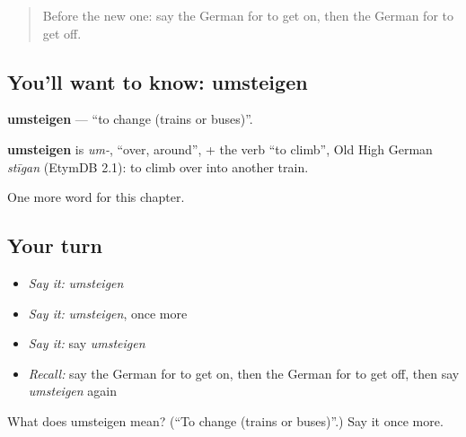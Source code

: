 \label{lesson:GE-C178-umsteigen}



\begin{quote}
Before the new one: say the German for to get on, then the German for to get off.
\end{quote}

\subsection*{You'll want to know: umsteigen}
\textbf{umsteigen} — \textquotedblleft{}to change (trains or buses)\textquotedblright{}.

\begin{cousinweb}
\textbf{umsteigen} is \emph{um-}, \textquotedblleft{}over, around\textquotedblright{}, + the verb \textquotedblleft{}to climb\textquotedblright{}, Old High German \emph{stīgan} (EtymDB 2.1): to climb over into another train.
\end{cousinweb}

\begin{grammarlens}[title={What you've built}]
One more word for this chapter.
\end{grammarlens}

\subsection*{Your turn}
\begin{itemize}
\raggedright
  \item \emph{Say it:} \emph{umsteigen}
  \item \emph{Say it:} \emph{umsteigen}, once more
  \item \emph{Say it:} say \emph{umsteigen}
  \item \emph{Recall:} say the German for to get on, then the German for to get off, then say \emph{umsteigen} again
\end{itemize}

\begin{tcolorbox}[breakable,colback=teal!4,colframe=teal!35!black,title={Before you move on}]
What does umsteigen mean? (\textquotedblleft{}To change (trains or buses)\textquotedblright{}.) Say it once more.
\end{tcolorbox}
